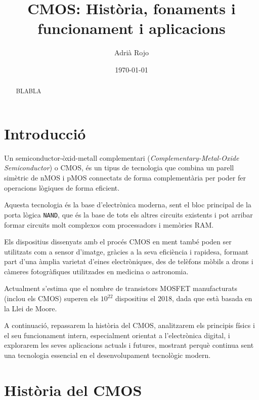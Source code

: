 \documentclass[11pt,a4paper]{article}
\title{\textbf{CMOS: Història, fonaments i funcionament i aplicacions}}
\author{Adrià Rojo}
\date{\today}
\begin{document}
\maketitle
\thispagestyle{empty}
\begin{abstract}
    BLABLA
\end{abstract}

\section{Introducció}

Un semiconductor-òxid-metall complementari (\textit{Complementary-Metal-Oxide Semiconductor}) o CMOS, és un tipus de tecnologia que combina un parell simètric de nMOS i pMOS connectats de forma complementària per poder fer operacions lògiques de forma eficient\autocite{wiki:CMOS}. 

Aquesta tecnologia és la base d'electrònica moderna, sent el bloc principal de la porta lògica \texttt{NAND}, que és la base de tots els altres circuits existents i pot arribar formar circuits molt complexos com processadors i memòries RAM.

Els dispositius dissenyats amb el procés CMOS en ment també poden ser utilitzats com a sensor d'imatge, gràcies a la seva eficiència i rapidesa, formant part d'una àmplia varietat d'eines electròniques, des de telèfons mòbils a drons i càmeres fotogràfiques utilitzades en medicina o astronomia. 

Actualment s'estima que el nombre de transistors MOSFET manufacturats (inclou els CMOS) superen els $10^{22}$ dispositius \autocite{wiki:Transistor_count} el 2018, dada que està basada en la Llei de Moore.


A continuació, repassarem la història del CMOS, analitzarem els principis físics i el seu funcionament intern, especialment orientat a l'electrònica digital, i explorarem les seves aplicacions actuals i futures, mostrant perquè continua sent una tecnologia essencial en el desenvolupament tecnològic modern.

\section{Història del CMOS}
\end{document}
